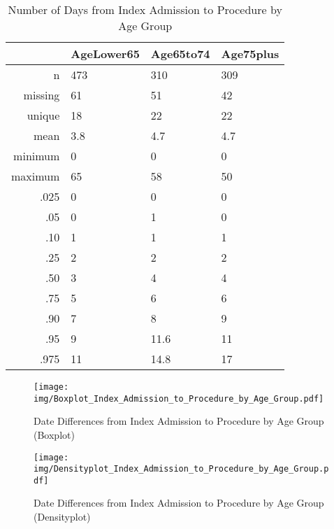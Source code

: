 \documentclass[a4paper]{report}
\begin{document}
\begin{itemize}
{%
\begin{table}[ht]
\centering
\begin{tabular}{rlll}
  \toprule
 & AgeLower65 & Age65to74 & Age75plus \\ 
  \midrule
n & 473 & 310 & 309 \\ 
  missing & 61 & 51 & 42 \\ 
  unique & 18 & 22 & 22 \\ 
  mean & 3.8 & 4.7 & 4.7 \\ 
  minimum & 0 & 0 & 0 \\ 
  maximum & 65 & 58 & 50 \\ 
  .025 & 0 & 0 & 0 \\ 
  .05 & 0 & 1 & 0 \\ 
  .10 & 1 & 1 & 1 \\ 
  .25 & 2 & 2 & 2 \\ 
  .50 & 3 & 4 & 4 \\ 
  .75 & 5 & 6 & 6 \\ 
  .90 & 7 & 8 & 9 \\ 
  .95 & 9 & 11.6 & 11 \\ 
  .975 & 11 & 14.8 & 17 \\ 
   \bottomrule
\end{tabular}
\caption{Number of Days from Index Admission to Procedure by Age Group} 
\end{table}
\begin{figure}
  \centering
  \caption{Date Differences from Index Admission to Procedure by Age Group (Boxplot)}
  \label{Boxplot: Date Differences from Index Admission to Procedure by Age Group}
\texttt{[image: img/Boxplot\_Index\_Admission\_to\_Procedure\_by\_Age\_Group.pdf]}\end{figure}


\begin{figure}
  \centering
  \caption{Date Differences from Index Admission to Procedure by Age Group (Densityplot)}
  \label{Density: Date Differences from Index Admission to Procedure by Age Group}
\texttt{[image: img/Densityplot\_Index\_Admission\_to\_Procedure\_by\_Age\_Group.pdf]}\end{figure}



\clearpage

}
\end{itemize}
\end{document}
